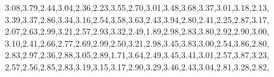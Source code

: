 \documentclass[
]{article}
\newenvironment{Shaded}{\begin{snugshade}}{\end{snugshade}}
\newcommand{\FloatTok}[1]{\textcolor[rgb]{0.00,0.00,0.81}{#1}}
\newcommand{\NormalTok}[1]{#1}
\begin{document}
\begin{Shaded}
\begin{Highlighting}[]
               \FloatTok{3.08}\NormalTok{,}\FloatTok{3.79}\NormalTok{,}\FloatTok{2.44}\NormalTok{,}\FloatTok{3.04}\NormalTok{,}\FloatTok{2.36}\NormalTok{,}\FloatTok{2.23}\NormalTok{,}\FloatTok{3.55}\NormalTok{,}\FloatTok{2.70}\NormalTok{,}\FloatTok{3.01}\NormalTok{,}\FloatTok{3.48}\NormalTok{,}\FloatTok{3.68}\NormalTok{,}\FloatTok{3.37}\NormalTok{,}\FloatTok{3.01}\NormalTok{,}\FloatTok{3.18}\NormalTok{,}\FloatTok{2.13}\NormalTok{,}
               \FloatTok{3.39}\NormalTok{,}\FloatTok{3.37}\NormalTok{,}\FloatTok{2.86}\NormalTok{,}\FloatTok{3.34}\NormalTok{,}\FloatTok{3.16}\NormalTok{,}\FloatTok{2.54}\NormalTok{,}\FloatTok{3.58}\NormalTok{,}\FloatTok{3.63}\NormalTok{,}\FloatTok{2.43}\NormalTok{,}\FloatTok{3.94}\NormalTok{,}\FloatTok{2.80}\NormalTok{,}\FloatTok{2.41}\NormalTok{,}\FloatTok{2.25}\NormalTok{,}\FloatTok{2.87}\NormalTok{,}\FloatTok{3.17}\NormalTok{,}
               \FloatTok{2.07}\NormalTok{,}\FloatTok{2.63}\NormalTok{,}\FloatTok{2.99}\NormalTok{,}\FloatTok{3.21}\NormalTok{,}\FloatTok{2.57}\NormalTok{,}\FloatTok{2.93}\NormalTok{,}\FloatTok{3.32}\NormalTok{,}\FloatTok{2.49}\NormalTok{,}\FloatTok{1.89}\NormalTok{,}\FloatTok{2.98}\NormalTok{,}\FloatTok{2.83}\NormalTok{,}\FloatTok{3.80}\NormalTok{,}\FloatTok{2.92}\NormalTok{,}\FloatTok{2.90}\NormalTok{,}\FloatTok{3.00}\NormalTok{,}
               \FloatTok{3.10}\NormalTok{,}\FloatTok{2.41}\NormalTok{,}\FloatTok{2.66}\NormalTok{,}\FloatTok{2.77}\NormalTok{,}\FloatTok{2.69}\NormalTok{,}\FloatTok{2.99}\NormalTok{,}\FloatTok{2.50}\NormalTok{,}\FloatTok{3.21}\NormalTok{,}\FloatTok{2.98}\NormalTok{,}\FloatTok{3.45}\NormalTok{,}\FloatTok{3.83}\NormalTok{,}\FloatTok{3.00}\NormalTok{,}\FloatTok{2.54}\NormalTok{,}\FloatTok{3.86}\NormalTok{,}\FloatTok{2.80}\NormalTok{,}
               \FloatTok{2.83}\NormalTok{,}\FloatTok{2.97}\NormalTok{,}\FloatTok{2.36}\NormalTok{,}\FloatTok{2.88}\NormalTok{,}\FloatTok{3.05}\NormalTok{,}\FloatTok{2.89}\NormalTok{,}\FloatTok{1.71}\NormalTok{,}\FloatTok{3.64}\NormalTok{,}\FloatTok{2.49}\NormalTok{,}\FloatTok{3.45}\NormalTok{,}\FloatTok{3.41}\NormalTok{,}\FloatTok{3.01}\NormalTok{,}\FloatTok{2.57}\NormalTok{,}\FloatTok{3.87}\NormalTok{,}\FloatTok{3.23}\NormalTok{,}
               \FloatTok{2.57}\NormalTok{,}\FloatTok{2.56}\NormalTok{,}\FloatTok{2.85}\NormalTok{,}\FloatTok{2.83}\NormalTok{,}\FloatTok{3.19}\NormalTok{,}\FloatTok{3.15}\NormalTok{,}\FloatTok{3.17}\NormalTok{,}\FloatTok{2.90}\NormalTok{,}\FloatTok{3.29}\NormalTok{,}\FloatTok{3.46}\NormalTok{,}\FloatTok{2.43}\NormalTok{,}\FloatTok{3.04}\NormalTok{,}\FloatTok{2.81}\NormalTok{,}\FloatTok{3.28}\NormalTok{,}\FloatTok{2.82}\NormalTok{,}

\end{Highlighting}
\end{Shaded}
\end{document}
